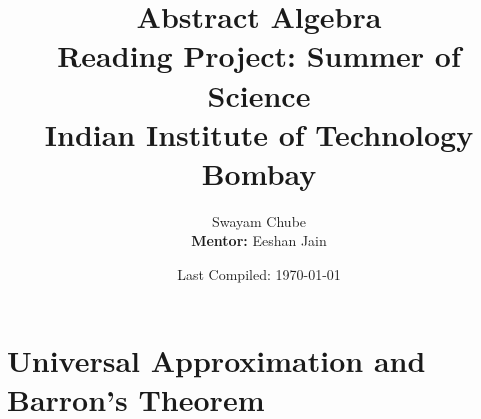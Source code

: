 \documentclass[a4paper, 12pt]{report}
\title{
	{Abstract Algebra}\\
	\small Reading Project: Summer of Science\\
	Indian Institute of Technology Bombay\\
}
\author{Swayam Chube\\\textbf{Mentor:} Eeshan Jain}
\date{Last Compiled: \today}
\begin{document}
	\maketitle
	\tableofcontents
	\chapter{Universal Approximation and Barron's Theorem}
	
\end{document}
